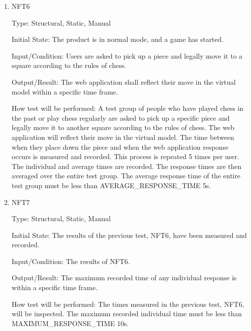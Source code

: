 \documentclass[12pt, titlepage]{article}
\begin{document}
\begin{enumerate}
    \item{NFT6}

        Type: Structural, Static, Manual
                            
        Initial State: The product is in normal mode, and a game has started.
                            
        Input/Condition: Users are asked to pick up a piece and legally move it to a square according to the rules of chess.
                            
        Output/Result: The web application shall reflect their move in the virtual model within a specific time frame.
                            
        How test will be performed: A test group of people who have played chess in the past or play chess regularly are asked to pick up a specific piece and 
            legally move it to another square according to the rules of chess. The web application will reflect their move in the virtual model. The time between 
            when they place down the piece and when the web application response occurs is measured and recorded. This process is repeated 5 times per user. The 
            individual and average times are recorded. The response times are then averaged over the entire test group. The average response time of the entire
            test group must be less than AVERAGE\_RESPONSE\_TIME 5s.

    \item{NFT7}

        Type: Structural, Static, Manual
                                
        Initial State: The results of the previous test, NFT6, have been measured and recorded.
                            
        Input/Condition: The results of NFT6.
                            
        Output/Result: The maximum recorded time of any individual response is within a specific time frame.
                            
        How test will be performed: The times measured in the previous test, NFT6, will be inspected. The maximum recorded individual time must be less than 
            MAXIMUM\_RESPONSE\_TIME 10s.
\end{enumerate}
\end{document}
